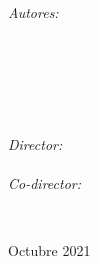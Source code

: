 \documentclass[
11pt, %
spanish, %
singlespacing, %
headsepline, %
]{MastersDoctoralThesis} %
\begin{document}
\begin{titlepage}
\begin{center}
		\begin{minipage}[t]{0.6\textwidth}
			\begin{flushleft} \large
				\emph{Autores:}\\
				\authornameA \\ %
				\matriculanameA \\
				\emailnameA \\
				\vspace{0.4cm} %
				\authornameB \\ %
				\matriculanameB \\
				\emailnameB
			\end{flushleft}
		\end{minipage}
		\begin{minipage}[t]{0.2\textwidth}
			\begin{flushright} \large
				\emph{Director:} \\
				\supname \\
        \vspace{0.2cm} %
				\emph{Co-director:} \\
				\examname
			\end{flushright}
		\end{minipage}\\[2cm]
				 
		\vfill
				
				 
		\vfill
				
		{\large {Octubre 2021}}\\[4cm] %
				 
		\vfill
	\end{center}
\end{titlepage}
\end{document}
